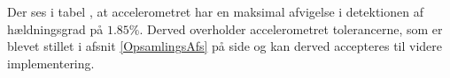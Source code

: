 Der ses i tabel , at accelerometret har en maksimal afvigelse i detektionen af hældningsgrad på $1.85\%$. Derved overholder accelerometret tolerancerne, som er blevet stillet i afsnit \ref{OpsamlingsAfs} på side \pageref{OpsamlingsAfs} og kan derved accepteres til videre implementering.